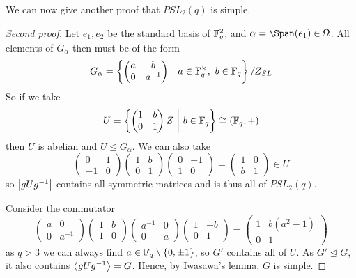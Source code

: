 \documentclass{article}
\begin{document}
We can now give another proof that $PSL_2(q)$ is simple.

\begin{proof}[Second proof]
    Let $e_1,e_2$ be the standard basis of $\mathbb{F}_q^2$, and $\alpha = \Span(e_1)\in \Omega$. All elements of $G_\alpha$ then must be of the form \[
    G_\alpha = \left\{ \begin{pmatrix}
    a & b \\ 0 & a^{-1}
    \end{pmatrix} \ \middle| \ a\in \mathbb{F}_q^\times, \ b\in \mathbb{F}_q\right\}/Z_{SL}
    \] So if we take \[
    U = \left\{ \begin{pmatrix}
        1 & b \\ 0 & 1
    \end{pmatrix}Z \ \middle| \ b\in \mathbb{F}_q \right\} \cong (\mathbb{F}_q,+)
    \] then $U$ is abelian and $U\unlhd G_\alpha$. We can also take \[
    \begin{pmatrix}
        0 & 1 \\ -1 & 0
    \end{pmatrix}\begin{pmatrix}
        1 & b \\ 0 & 1
    \end{pmatrix}\begin{pmatrix}
        0 & -1 \\ 1 & 0
    \end{pmatrix} = \begin{pmatrix}
        1 & 0 \\ b & 1
    \end{pmatrix}\in U
    \] so $\left| gUg^{-1} \right|$ contains all symmetric matrices and is thus all of $PSL_2(q)$.

    Consider the commutator \[
    \begin{pmatrix}
        a & 0 \\ 0 & a^{-1}
    \end{pmatrix}\begin{pmatrix}
        1 & b \\ 1 & 0
    \end{pmatrix}\begin{pmatrix}
        a^{-1} & 0 \\ 0 & a
    \end{pmatrix}\begin{pmatrix}
        1 & -b \\ 0 & 1
    \end{pmatrix} = \begin{pmatrix}
        1 & b(a^2-1) \\ 0 & 1
    \end{pmatrix}
    \] as $q>3$ we can always find $a \in \mathbb{F}_q\setminus \{0,\pm1 \}$, so $G'$ contains all of $U$. As $G'\unlhd G$, it also contains $\left\langle gUg^{-1} \right\rangle=G$. Hence, by Iwasawa's lemma, $G$ is simple.
\end{proof}
\end{document}
